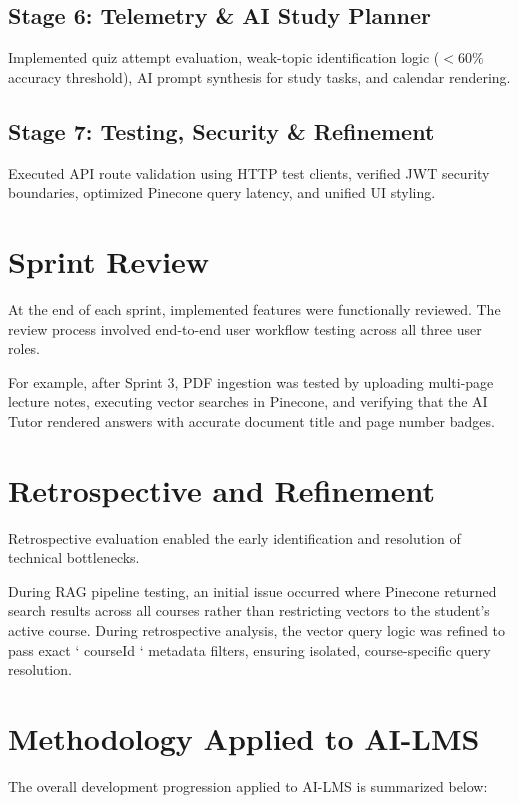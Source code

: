 \subsection{Stage 6: Telemetry \& AI Study Planner}
Implemented quiz attempt evaluation, weak-topic identification logic ($<60\%$ accuracy threshold), AI prompt synthesis for study tasks, and calendar rendering.

\subsection{Stage 7: Testing, Security \& Refinement}
Executed API route validation using HTTP test clients, verified JWT security boundaries, optimized Pinecone query latency, and unified UI styling.

\section{Sprint Review}

At the end of each sprint, implemented features were functionally reviewed. The review process involved end-to-end user workflow testing across all three user roles.

For example, after Sprint 3, PDF ingestion was tested by uploading multi-page lecture notes, executing vector searches in Pinecone, and verifying that the AI Tutor rendered answers with accurate document title and page number badges.

\section{Retrospective and Refinement}

Retrospective evaluation enabled the early identification and resolution of technical bottlenecks.

During RAG pipeline testing, an initial issue occurred where Pinecone returned search results across all courses rather than restricting vectors to the student's active course. During retrospective analysis, the vector query logic was refined to pass exact `{ courseId }` metadata filters, ensuring isolated, course-specific query resolution.

\section{Methodology Applied to AI-LMS}

The overall development progression applied to AI-LMS is summarized below:

